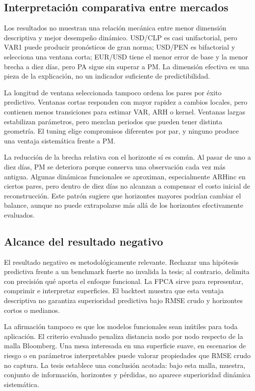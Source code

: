\documentclass[a4paper,11pt]{article}
\begin{document}
\subsection{Interpretación comparativa entre mercados}

Los resultados no muestran una relación mecánica entre menor dimensión descriptiva y mejor desempeño dinámico. USD/CLP es casi unifactorial, pero VAR1 puede producir pronósticos de gran norma; USD/PEN es bifactorial y selecciona una ventana corta; EUR/USD tiene el menor error de base y la menor brecha a diez días, pero PA sigue sin superar a PM. La dimensión efectiva es una pieza de la explicación, no un indicador suficiente de predictibilidad.

La longitud de ventana seleccionada tampoco ordena los pares por éxito predictivo. Ventanas cortas responden con mayor rapidez a cambios locales, pero contienen menos transiciones para estimar VAR, ARH o kernel. Ventanas largas estabilizan parámetros, pero mezclan periodos que pueden tener distinta geometría. El tuning elige compromisos diferentes por par, y ninguno produce una ventaja sistemática frente a PM.

La reducción de la brecha relativa con el horizonte sí es común. Al pasar de uno a diez días, PM se deteriora porque conserva una observación cada vez más antigua. Algunas dinámicas funcionales se aproximan, especialmente ARHinc en ciertos pares, pero dentro de diez días no alcanzan a compensar el costo inicial de reconstrucción. Este patrón sugiere que horizontes mayores podrían cambiar el balance, aunque no puede extrapolarse más allá de los horizontes efectivamente evaluados.

\subsection{Alcance del resultado negativo}

El resultado negativo es metodológicamente relevante. Rechazar una hipótesis predictiva frente a un benchmark fuerte no invalida la tesis; al contrario, delimita con precisión qué aporta el enfoque funcional. La FPCA sirve para representar, comprimir e interpretar superficies. El backtest muestra que esta ventaja descriptiva no garantiza superioridad predictiva bajo RMSE crudo y horizontes cortos o medianos.

La afirmación tampoco es que los modelos funcionales sean inútiles para toda aplicación. El criterio evaluado penaliza distancia nodo por nodo respecto de la malla Bloomberg. Una mesa interesada en una superficie suave, en escenarios de riesgo o en parámetros interpretables puede valorar propiedades que RMSE crudo no captura. La tesis establece una conclusión acotada: bajo esta malla, muestra, conjunto de información, horizontes y pérdidas, no aparece superioridad dinámica sistemática.
\end{document}
